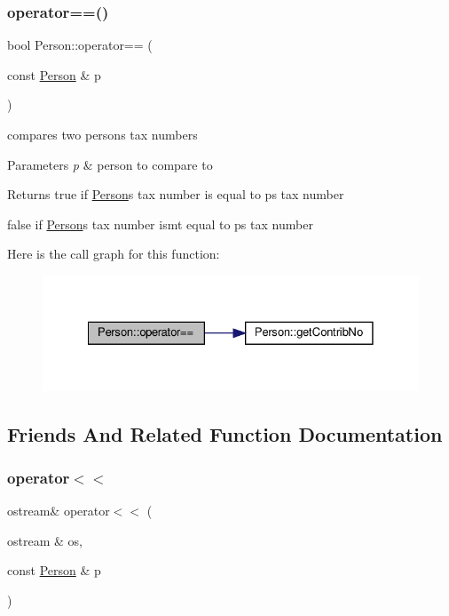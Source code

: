 \subsubsection{\texorpdfstring{operator==()}{operator==()}}
{\footnotesize\ttfamily bool Person\+::operator== (\begin{DoxyParamCaption}\item[{const \hyperlink{classPerson}{Person} \&}]{p }\end{DoxyParamCaption})}



compares two person\textquotesingle{}s tax numbers 


\begin{DoxyParams}{Parameters}
{\em p} & person to compare to \\
\hline
\end{DoxyParams}
\begin{DoxyReturn}{Returns}
true if \hyperlink{classPerson}{Person}\textquotesingle{}s tax number is equal to p\textquotesingle{}s tax number 

false if \hyperlink{classPerson}{Person}\textquotesingle{}s tax number ism\textquotesingle{}t equal to p\textquotesingle{}s tax number 
\end{DoxyReturn}
Here is the call graph for this function\+:\nopagebreak
\begin{figure}[H]
\begin{center}
\leavevmode
\includegraphics[width=328pt]{classPerson_a8b98ec6713875725a005f2b0ad19fa4c_cgraph}
\end{center}
\end{figure}


\subsection{Friends And Related Function Documentation}
\mbox{\label{classPerson_a520925d2df99c77933138568a48577dd}} 
\subsubsection{\texorpdfstring{operator$<$$<$}{operator<<}}
{\footnotesize\ttfamily ostream\& operator$<$$<$ (\begin{DoxyParamCaption}\item[{ostream \&}]{os,  }\item[{const \hyperlink{classPerson}{Person} \&}]{p }\end{DoxyParamCaption})\hspace{0.3cm}{\ttfamily [friend]}}



